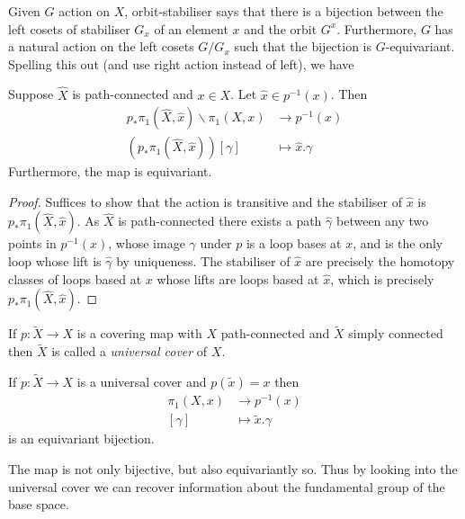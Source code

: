 \documentclass[a4paper]{article}
\begin{document}
Given \(G\) action on \(X\), orbit-stabiliser says that there is a bijection between the left cosets of stabiliser \(G_x\) of an element \(x\) and the orbit \(G^x\). Furthermore, \(G\) has a natural action on the left cosets \(G/G_x\) such that the bijection is \(G\)-equivariant. Spelling this out (and use right action instead of left), we have

\begin{lemma}
  Suppose \(\hat X\) is path-connected and \(x \in X\). Let \(\hat x \in p^{-1}(x)\). Then
  \begin{align*}
    p_*\pi_1(\hat X, \hat x) \backslash \pi_1(X, x) &\to p^{-1}(x) \\
    (p_* \pi_1(\hat X, \hat x)) [\gamma] &\mapsto \hat x. \gamma
  \end{align*}
  Furthermore, the map is equivariant.
\end{lemma}

\begin{proof}
  Suffices to show that the action is transitive and the stabiliser of \(\hat x\) is \(p_* \pi_1(\hat X, \hat x)\). As \(\hat X\) is path-connected there exists a path \(\hat \gamma\) between any two points in \(p^{-1}(x)\), whose image \(\gamma\) under \(p\) is a loop bases at \(x\), and is the only loop whose lift is \(\hat \gamma\) by uniqueness. The stabiliser of \(\hat x\) are precisely the homotopy classes of loops based at \(x\) whose lifts are loops based at \(\hat x\), which is precisely \(p_* \pi_1(\hat X, \hat x)\).
\end{proof}

\begin{definition}
  If \(p: \tilde X \to X\) is a covering map with \(X\) path-connected and \(\tilde X\) simply connected then \(\tilde X\) is called a \emph{universal cover} of \(X\).
\end{definition}

\begin{corollary}
  If \(p: \tilde X \to X\) is a universal cover and \(p(\tilde x) = x\) then
  \begin{align*}
    \pi_1(X, x) &\to p^{-1}(x) \\
    [\gamma] &\mapsto \tilde x . \gamma
  \end{align*}
  is an equivariant bijection.
\end{corollary}

The map is not only bijective, but also equivariantly so. Thus by looking into the universal cover we can recover information about the fundamental group of the base space.
\end{document}
